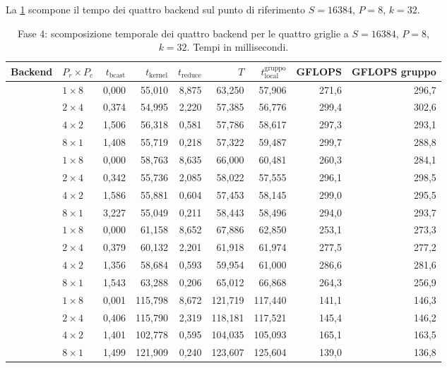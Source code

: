 La \cref{tab:ris-fase4-griglia} scompone il tempo dei quattro backend sul punto
di riferimento $S=16384$, $P=8$, $k=32$.

\begin{table}[H]
\centering
\footnotesize
\caption{Fase 4: scomposizione temporale dei quattro backend per le quattro
griglie a $S=\num{16384}$, $P=8$, $k=32$. Tempi in millisecondi.}
\label{tab:ris-fase4-griglia}
\begin{tabular}{@{}llrrrrrrr@{}}
\toprule
\textbf{Backend} & $P_r\times P_c$ & $t_{\mathrm{bcast}}$ & $t_{\mathrm{kernel}}$
& $t_{\mathrm{reduce}}$ & $T$ & $t_{\mathrm{local}}^{\mathrm{gruppo}}$
& GFLOPS & GFLOPS gruppo \\
\midrule

\multirow{4}{*}{{cuda\_naive}}
& $1\times8$ & 0,000 & 55,010 & 8,875 & 63,250 & 57,906 & 271,6 & 296,7 \\
& $2\times4$ & 0,374 & 54,995 & 2,220 & 57,385 & 56,776 & 299,4 & 302,6 \\
& $4\times2$ & 1,506 & 56,318 & 0,581 & 57,786 & 58,617 & 297,3 & 293,1 \\
& $8\times1$ & 1,408 & 55,719 & 0,218 & 57,322 & 59,487 & 299,7 & 288,8 \\

\midrule

\multirow{4}{*}{{cuda\_warp}}
& $1\times8$ & 0,000 & 58,763 & 8,635 & 66,000 & 60,481 & 260,3 & 284,1 \\
& $2\times4$ & 0,342 & 55,736 & 2,085 & 58,022 & 57,555 & 296,1 & 298,5 \\
& $4\times2$ & 1,586 & 55,881 & 0,604 & 57,453 & 58,145 & 299,0 & 295,5 \\
& $8\times1$ & 3,227 & 55,049 & 0,211 & 58,443 & 58,496 & 294,0 & 293,7 \\

\midrule

\multirow{4}{*}{{cuda\_warp\_smem}}
& $1\times8$ & 0,000 & 61,158 & 8,652 & 67,886 & 62,850 & 253,1 & 273,3 \\
& $2\times4$ & 0,379 & 60,132 & 2,201 & 61,918 & 61,974 & 277,5 & 277,2 \\
& $4\times2$ & 1,356 & 58,684 & 0,593 & 59,954 & 61,000 & 286,6 & 281,6 \\
& $8\times1$ & 1,543 & 63,288 & 0,206 & 65,012 & 66,868 & 264,3 & 256,9 \\

\midrule

\multirow{4}{*}{{cublas}}
& $1\times8$ & 0,001 & 115,798 & 8,672 & 121,719 & 117,440 & 141,1 & 146,3 \\
& $2\times4$ & 0,406 & 115,790 & 2,319 & 118,181 & 117,521 & 145,4 & 146,2 \\
& $4\times2$ & 1,401 & 102,778 & 0,595 & 104,035 & 105,093 & 165,1 & 163,5 \\
& $8\times1$ & 1,499 & 121,909 & 0,240 & 123,607 & 125,604 & 139,0 & 136,8 \\

\bottomrule
\end{tabular}
\end{table}

